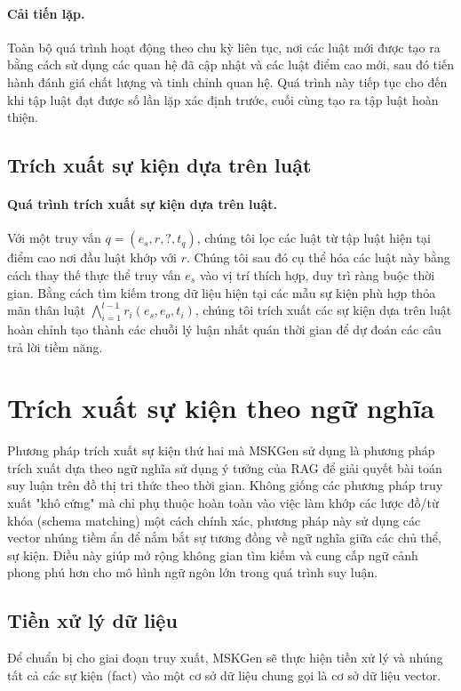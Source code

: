 \paragraph{Cải tiến lặp.}
Toàn bộ quá trình hoạt động theo chu kỳ liên tục, nơi các luật mới được tạo ra bằng cách sử dụng các quan hệ đã cập nhật và các luật điểm cao mới, sau đó tiến hành đánh giá chất lượng và tinh chỉnh quan hệ. Quá trình này tiếp tục cho đến khi tập luật đạt được số lần lặp xác định trước, cuối cùng tạo ra tập luật hoàn thiện.

\subsection{Trích xuất sự kiện dựa trên luật}

\paragraph{Quá trình trích xuất sự kiện dựa trên luật.}
Với một truy vấn $q = (e_s, r, ?, t_q)$, chúng tôi lọc các luật từ tập luật hiện tại điểm cao nơi đầu luật khớp với $r$. Chúng tôi sau đó cụ thể hóa các luật này bằng cách thay thế thực thể truy vấn $e_s$ vào vị trí thích hợp, duy trì ràng buộc thời gian. Bằng cách tìm kiếm trong dữ liệu hiện tại các mẫu sự kiện phù hợp thỏa mãn thân luật $\bigwedge_{i=1}^{l-1} r_i(e_s, e_o, t_i)$, chúng tôi trích xuất các sự kiện dựa trên luật hoàn chỉnh tạo thành các chuỗi lý luận nhất quán thời gian để dự đoán các câu trả lời tiềm năng.

\vspace{1em}
\section{Trích xuất sự kiện theo ngữ nghĩa}

Phương pháp trích xuất sự kiện thứ hai mà MSKGen sử dụng là phương pháp trích xuất dựa theo ngữ nghĩa sử dụng ý tưởng của RAG để giải quyết bài toán suy luận trên đồ thị tri thức theo thời gian. Không giống các phương pháp truy xuất "khô cứng" mà chỉ phụ thuộc hoàn toàn vào việc làm khớp các lược đồ/từ khóa (schema matching) một cách chính xác, phương pháp này sử dụng các vector nhúng tiềm ẩn để nắm bắt sự tương đồng về ngữ nghĩa giữa các chủ thể, sự kiện. Điều này giúp mở rộng không gian tìm kiếm và cung cấp ngữ cảnh phong phú hơn cho mô hình ngữ ngôn lớn trong quá trình suy luận.

\vspace{1em}
\subsection{Tiền xử lý dữ liệu}
Để chuẩn bị cho giai đoạn truy xuất, MSKGen sẽ thực hiện tiền xử lý và nhúng tất cả các sự kiện (fact) vào một cơ sở dữ liệu chung gọi là cơ sở dữ liệu vector.

